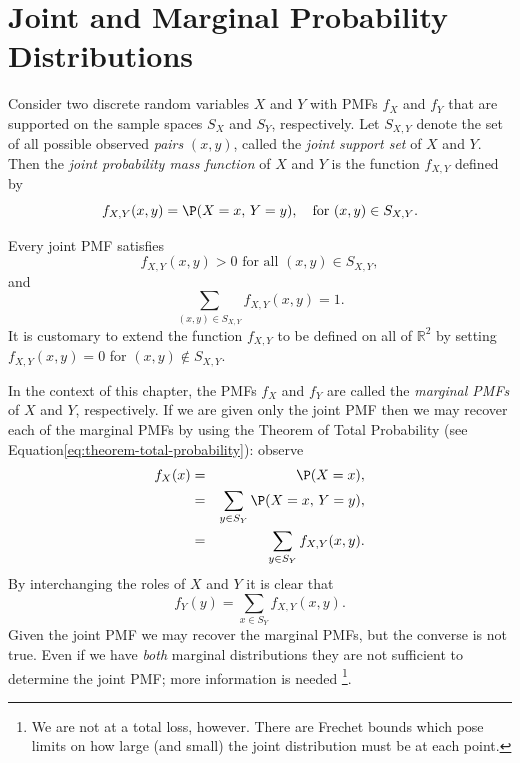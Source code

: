 \documentclass[captions=tableheading]{scrbook}
\begin{document}
\section{Joint and Marginal Probability Distributions}
\label{sec-7-1}

\label{sec:Joint-Probability-Distributions}

Consider two discrete random variables \(X\) and \(Y\) with PMFs \(f_{X}\) and \(f_{Y}\) that are supported on the sample spaces \(S_{X}\) and \(S_{Y}\), respectively. Let \(S_{X,Y}\) denote the set of all possible observed \emph{pairs} \((x,y)\), called the \emph{joint support set} of \(X\) and \(Y\). Then the \emph{joint probability mass function} of \(X\) and \(Y\) is the function \(f_{X,Y}\) defined by
\begin{equation}
f_{X,Y}(x,y)=\P(X=x,\, Y=y),\quad\mbox{for }(x,y)\in S_{X,Y}.\label{eq:joint-pmf}
\end{equation}


Every joint PMF satisfies
\begin{equation}
f_{X,Y}(x,y)>0\mbox{ for all }(x,y)\in S_{X,Y},
\end{equation}
and
\begin{equation}
\sum_{(x,y)\in S_{X,Y}}f_{X,Y}(x,y)=1.
\end{equation}
It is customary to extend the function \(f_{X,Y}\) to be defined on all of \(\mathbb{R}^{2}\) by setting \(f_{X,Y}(x,y)=0\) for \((x,y)\not\in S_{X,Y}\). 

In the context of this chapter, the PMFs \(f_{X}\) and \(f_{Y}\) are called the \emph{marginal PMFs} of \(X\) and \(Y\), respectively. If we are given only the joint PMF then we may recover each of the marginal PMFs by using the Theorem of Total Probability (see Equation\ref{eq:theorem-total-probability}): observe
\begin{eqnarray}
f_{X}(x) & = & \P(X=x),\\
 & = & \sum_{y\in S_{Y}}\P(X=x,\, Y=y),\\
 & = & \sum_{y\in S_{Y}}f_{X,Y}(x,y).
\end{eqnarray}
By interchanging the roles of \(X\) and \(Y\) it is clear that 
\begin{equation}
f_{Y}(y)=\sum_{x\in S_{Y}}f_{X,Y}(x,y).\label{eq:marginal-pmf}
\end{equation}
Given the joint PMF we may recover the marginal PMFs, but the converse is not true. Even if we have \emph{both} marginal distributions they are not sufficient to determine the joint PMF; more information is needed
\footnote{We are not at a total loss, however. There are Frechet bounds which pose limits on how large (and small) the joint distribution must be at each point.}.
\end{document}
